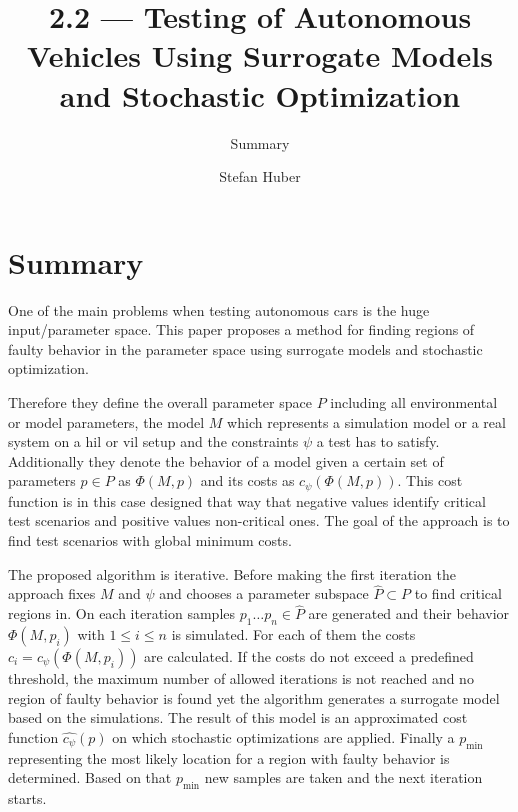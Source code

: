 \documentclass[oneside, notitlepage, twocolumn]{scrartcl}
\title{\LARGE 2.2 --- Testing of Autonomous Vehicles Using Surrogate Models and Stochastic Optimization}
\subtitle{Summary}
\author{Stefan Huber}
\begin{document}
\maketitle

\section{Summary}
One of the main problems when testing autonomous cars is the huge input/parameter space.
This paper proposes a method for finding regions of faulty behavior in the parameter space using surrogate models and stochastic optimization.\par
Therefore they define the overall parameter space \(P\) including all environmental or model parameters, the model \(M\) which represents a simulation model or a real system on a \gls{hil} or \gls{vil} setup and the constraints \(\psi\) a test has to satisfy.
Additionally they denote the behavior of a model given a certain set of parameters \(p\in P\) as \(\Phi (M, p)\) and its costs as \(c_\psi(\Phi(M, p))\).
This cost function is in this case designed that way that negative values identify critical test scenarios and positive values non-critical ones.
The goal of the approach is to find test scenarios with global minimum costs.\par
The proposed algorithm is iterative.
Before making the first iteration the approach fixes \(M\) and \(\psi\) and chooses a parameter subspace \(\hat{P}\subset P\) to find critical regions in.
On each iteration samples \(p_1\ldots p_n\in \hat{P}\) are generated and their behavior \(\Phi (M, p_i)\) with \(1 \leq i \leq n\) is simulated.
For each of them the costs \(c_i=c_\psi(\Phi(M, p_i))\) are calculated.
If the costs do not exceed a predefined threshold, the maximum number of allowed iterations is not reached and no region of faulty behavior is found yet the algorithm generates a surrogate model based on the simulations.
The result of this model is an approximated cost function \(\hat{c_\psi}(p)\) on which stochastic optimizations are applied.
Finally a \(p_\min\) representing the most likely location for a region with faulty behavior is determined.
Based on that \(p_\min\) new samples are taken and the next iteration starts.
\end{document}
